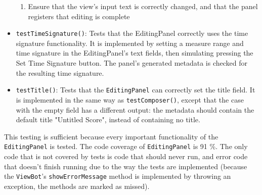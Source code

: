 \documentclass[11pt]{article}
\begin{document}
\begin{itemize}
\begin{enumerate}
\item Ensure that the view's input text is correctly changed, and that the panel registers that editing is complete
\end{enumerate}
\item \texttt{testTimeSignature()}: Tests that the EditingPanel correctly uses the time signature functionality.  It is implemented by setting a measure range and time signature in the EditingPanel's text fields, then simulating pressing the Set Time Signature button.  The panel's generated metadata is checked for the resulting time signature.
\item \texttt{testTitle()}: Tests that the \texttt{EditingPanel} can correctly set the title field.  It is implemented in the same way as \texttt{testComposer()}, except that the case with the empty field has a different output: the metadata should contain the default title "Untitled Score", instead of containing no title.
\end{itemize}

This testing is sufficient because every important functionality of the \texttt{EditingPanel} is tested.  The code coverage of \texttt{EditingPanel} is 91 \%.  The only code that is not covered by tests is code that should never run, and error code that doesn't finish running due to the way the tests are implemented (because the \texttt{ViewBot}'s \texttt{showErrorMessage} method is implemented by throwing an exception, the methods are marked as missed).
\end{document}

